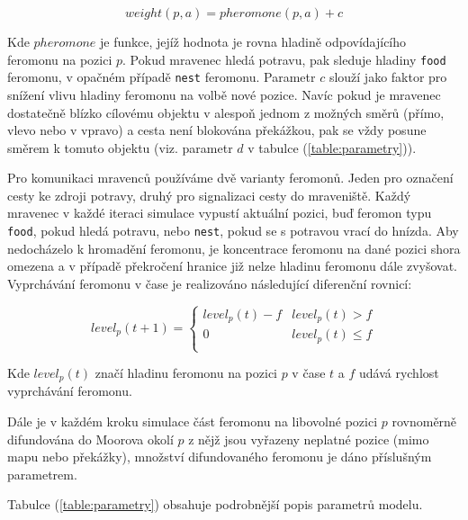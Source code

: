 \documentclass[10pt,a4paper,twocolumn]{article}
\begin{document}
\begin{equation}
  weight(p, a) = pheromone(p, a) + c
\end{equation}

Kde $pheromone$ je funkce, jejíž hodnota je rovna hladině odpovídajícího 
feromonu na pozici $p$. Pokud mravenec hledá potravu, pak sleduje hladiny \texttt{food}
feromonu, v opačném případě \texttt{nest} feromonu.
Parametr $c$ slouží jako faktor pro snížení vlivu hladiny feromonu na volbě
nové pozice. Navíc pokud je mravenec dostatečně blízko cílovému objektu
v alespoň jednom z možných směrů (přímo, vlevo nebo v vpravo) a cesta
není blokována překážkou, pak se vždy posune směrem k tomuto objektu (viz.
parametr $d$ v tabulce (\ref{table:parametry})). 

Pro komunikaci mravenců používáme dvě varianty feromonů. Jeden pro označení 
cesty ke zdroji potravy, druhý pro signalizaci cesty do mraveniště. 
Každý mravenec v každé iteraci simulace vypustí aktuální pozici, buď feromon typu
\texttt{food}, pokud hledá potravu, nebo \texttt{nest}, pokud se s potravou
vrací do hnízda. Aby nedocházelo k hromadění feromonu, je koncentrace feromonu
na dané pozici shora omezena a v případě překročení hranice již nelze hladinu
feromonu dále zvyšovat. Vyprchávání feromonu v čase je realizováno následující 
diferenční rovnicí:

\begin{equation}
  level_{p}(t+1) = 
  \left\{
    \begin{array}{ll}
      level_{p}(t) - f  & level_{p}(t) > f \\
      0 & level_{p}(t) \leq f \\ 
    \end{array}
  \right.
\end{equation}

Kde $level_{p}(t)$ značí hladinu feromonu na pozici $p$ v čase $t$ a $f$
udává rychlost vyprchávání feromonu.

Dále je v každém kroku simulace část feromonu na libovolné pozici $p$ 
rovnoměrně difundována do Moorova okolí $p$ z nějž jsou vyřazeny neplatné pozice
(mimo mapu nebo překážky), množství difundovaného feromonu je dáno 
příslušným parametrem.

Tabulce (\ref{table:parametry}) obsahuje podrobnější popis parametrů modelu.
\end{document}
